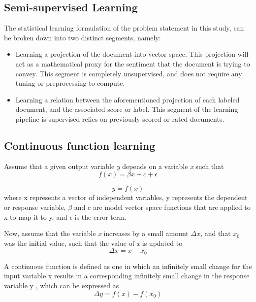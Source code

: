\documentclass[conference]{IEEEtran}
\begin{document}
    \subsection{Semi-supervised Learning}
        The statistical learning formulation of the problem statement in this study, can be broken down into two distinct segments, namely:
        \begin{itemize}
            \item Learning a projection of the document into vector space. This projection will act as a mathematical proxy for the sentiment that the document is trying to convey. This segment is completely unsupervised, and does not require any tuning or preprocessing to compute.
            \item Learning a relation between the aforementioned projection of each labeled document, and the associated score or label. This segment of the learning pipeline is supervised relies on previously scored or rated documents.
        \end{itemize}

    \subsection{Continuous function learning}
        Assume that a given output variable \textit{y} depends on a variable \textit{x} such that
        \begin{equation}
            \displaystyle f(x) = \beta x + c + \epsilon
        \end{equation}

        \begin{equation}
            \displaystyle y = f(x)
        \end{equation}
        where x represents a vector of independent variables, y represents the dependent or response variable, $\beta$ and c are model vector space functions that are applied to x to map it to y, and $\epsilon$ is the error term.

        Now, assume that the variable \textit{x} increases by a small amount $\Delta x$, and that $x_0$ was the initial value, such that the value of \textit{x} is updated to
        \begin{equation}
            \displaystyle \Delta x = x - x_0
        \end{equation}

        A continuous function is defined as one in which an infinitely small change for the input variable x results in a corresponding infinitely small change in the response variable y \cite{continuous_function}, which can be expressed as
        \begin{equation}
            \displaystyle \Delta y = f(x) - f(x_0)
        \end{equation}
\end{document}
